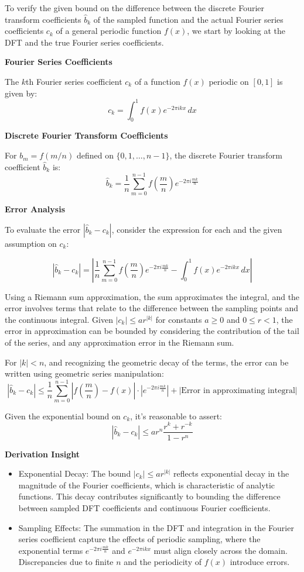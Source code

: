 \documentclass[8pt]{article}
\begin{document}
To verify the given bound on the difference between the discrete Fourier transform coefficients \( \hat{b}_k \) of the sampled function and the actual Fourier series coefficients \( c_k \) of a general periodic function \( f(x) \), we start by looking at the DFT and the true Fourier series coefficients. 

\textbf{Fourier Series Coefficients}

The \(k\)th Fourier series coefficient \(c_k\) of a function \(f(x)\) periodic on \([0, 1]\) is given by:
\[
c_k = \int_0^1 f(x) e^{-2\pi i k x} \, dx
\]

\textbf{Discrete Fourier Transform Coefficients}

For \(b_m = f(m/n)\) defined on \(\{0, 1, \ldots, n-1\}\), the discrete Fourier transform coefficient \( \hat{b}_k \) is:
\[
\hat{b}_k = \frac{1}{n} \sum_{m=0}^{n-1} f\left(\frac{m}{n}\right) e^{-2\pi i \frac{mk}{n}}
\]

\textbf{Error Analysis}

To evaluate the error \( |\hat{b}_k - c_k| \), consider the expression for each and the given assumption on \(c_k\):

\[
|\hat{b}_k - c_k| = \left| \frac{1}{n} \sum_{m=0}^{n-1} f\left(\frac{m}{n}\right) e^{-2\pi i \frac{mk}{n}} - \int_0^1 f(x) e^{-2\pi i k x} \, dx \right|
\]

Using a Riemann sum approximation, the sum approximates the integral, and the error involves terms that relate to the difference between the sampling points and the continuous integral. Given \(|c_k| \leq ar^{|k|}\) for constants \(a \geq 0\) and \(0 \leq r < 1\), the error in approximation can be bounded by considering the contribution of the tail of the series, and any approximation error in the Riemann sum.

For \(|k| < n\), and recognizing the geometric decay of the terms, the error can be written using geometric series manipulation:
\[
|\hat{b}_k - c_k| \leq \frac{1}{n} \sum_{m=0}^{n-1} |f\left(\frac{m}{n}\right) - f(x)| \cdot \left|e^{-2\pi i \frac{mk}{n}}\right| + \left| \text{Error in approximating integral} \right|
\]

Given the exponential bound on \(c_k\), it's reasonable to assert:
\[
|\hat{b}_k - c_k| \leq ar^n \frac{r^k + r^{-k}}{1 - r^n}
\]

\textbf{Derivation Insight}

\begin{itemize}
    \item Exponential Decay: The bound \(|c_k| \leq ar^{|k|}\) reflects exponential decay in the magnitude of the Fourier coefficients, which is characteristic of analytic functions. This decay contributes significantly to bounding the difference between sampled DFT coefficients and continuous Fourier coefficients.
    \item Sampling Effects: The summation in the DFT and integration in the Fourier series coefficient capture the effects of periodic sampling, where the exponential terms \(e^{-2\pi i \frac{mk}{n}}\) and \(e^{-2\pi i k x}\) must align closely across the domain. Discrepancies due to finite \(n\) and the periodicity of \(f(x)\) introduce errors.
\end{itemize}
\end{document}
